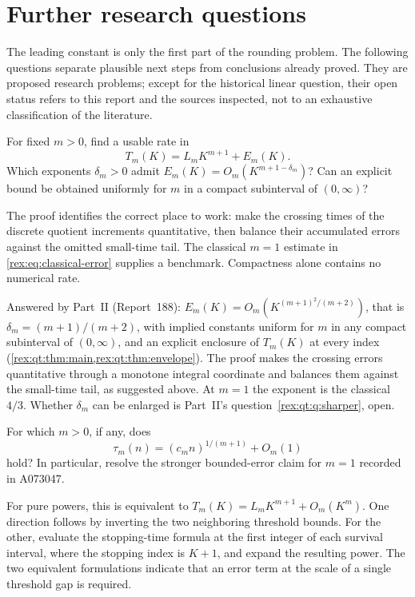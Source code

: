 \section{Further research questions}\label{rex:sec:questions}

The leading constant is only the first part of the rounding problem.
The following questions separate plausible next steps from conclusions
already proved. They are proposed research problems; except for the
historical linear question, their open status refers to this report
and the sources inspected, not to an exhaustive classification of the
literature.

\begin{question}\label{rex:q:rates}
For fixed $m>0$, find a usable rate in
\[
 T_m(K)=L_mK^{m+1}+E_m(K).
\]
Which exponents $\delta_m>0$ admit
$E_m(K)=O_m(K^{m+1-\delta_m})$? Can an explicit bound be obtained
uniformly for $m$ in a compact subinterval of $(0,\infty)$?
\end{question}

The proof identifies the correct place to work: make the crossing
times of the discrete quotient increments quantitative, then balance
their accumulated errors against the omitted small-time tail. The
classical $m=1$ estimate in \cref{rex:eq:classical-error} supplies a
benchmark. Compactness alone contains no numerical rate.

\begin{writenote}
Answered by Part~II (Report~188): $E_m(K)=O_m(K^{(m+1)^2/(m+2)})$,
that is $\delta_m=(m+1)/(m+2)$, with implied constants uniform for $m$ in
any compact subinterval of $(0,\infty)$, and an explicit enclosure of
$T_m(K)$ at every index (\cref{rex:qt:thm:main,rex:qt:thm:envelope}). The
proof makes the crossing errors quantitative through a monotone integral
coordinate and balances them against the small-time tail, as suggested
above. At $m=1$ the exponent is the classical $4/3$. Whether $\delta_m$
can be enlarged is Part~II's question~\ref{rex:qt:q:sharper}, open.
\end{writenote}

\begin{question}\label{rex:q:bounded}
For which $m>0$, if any, does
\[
 \tau_m(n)=(c_mn)^{1/(m+1)}+O_m(1)
\]
hold? In particular, resolve the stronger bounded-error claim for
$m=1$ recorded in A073047.
\end{question}

For pure powers, this is equivalent to
$T_m(K)=L_mK^{m+1}+O_m(K^m)$. One direction follows by inverting the
two neighboring threshold bounds. For the other, evaluate the
stopping-time formula at the first integer of each survival interval,
where the stopping index is $K+1$, and expand the resulting power.
The two equivalent formulations indicate that an error term at the
scale of a single threshold gap is required.

